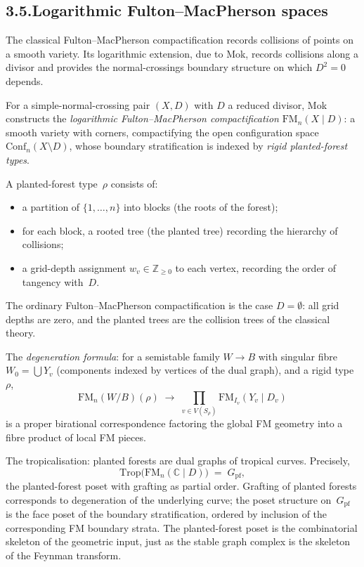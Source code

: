 \documentclass[11pt]{report}
\theoremstyle{definition}
\theoremstyle{remark}
\numberwithin{equation}{section}
\begin{document}
\subsection*{3.5.\enspace Logarithmic Fulton--MacPherson spaces}

The classical Fulton--MacPherson
compactification records collisions of points on a smooth variety.
Its logarithmic extension, due to Mok, records collisions along
a divisor and provides the normal-crossings boundary structure
on which $D^2=0$ depends.

For a simple-normal-crossing pair $(X,D)$ with $D$ a reduced divisor,
Mok constructs the \emph{logarithmic Fulton--MacPherson
compactification} $\mathrm{FM}_n(X\mathbin{|}D)$: a smooth
variety with corners, compactifying the open configuration space
$\mathrm{Conf}_n(X\setminus D)$, whose boundary stratification is
indexed by \emph{rigid planted-forest types}.

A planted-forest type~$\rho$ consists of:
\begin{itemize}
\item a partition of $\{1,\dots,n\}$ into blocks (the roots of the
forest);
\item for each block, a rooted tree (the planted tree) recording the
hierarchy of collisions;
\item a grid-depth assignment $w_v\in\mathbb Z_{\ge 0}$ to each
vertex, recording the order of tangency with~$D$.
\end{itemize}
The ordinary Fulton--MacPherson compactification is the case
$D=\emptyset$: all grid depths are zero, and the planted trees are
the collision trees of the classical theory.

The \emph{degeneration formula}: for a semistable family $W\to B$
with singular fibre $W_0=\bigcup Y_v$ (components indexed by
vertices of the dual graph), and a rigid type~$\rho$,
\[
\mathrm{FM}_n(W/B)(\rho)
\;\longrightarrow\;
\prod_{v\in V(S_\rho)}
\mathrm{FM}_{I_v}(Y_v\mathbin{|}D_v)
\]
is a proper birational correspondence factoring the global
FM geometry into a fibre product of local FM pieces.

The tropicalisation: planted forests are dual graphs of tropical
curves. Precisely,
\[
\mathrm{Trop}\bigl(\mathrm{FM}_n(\mathbb C\mathbin{|}D)\bigr)
\;=\;
G_{\mathrm{pf}},
\]
the planted-forest poset with grafting as partial order. Grafting of
planted forests corresponds to degeneration of the underlying curve;
the poset structure on~$G_{\mathrm{pf}}$ is the face poset of the
boundary stratification, ordered by inclusion of the corresponding
FM boundary strata. The planted-forest poset
is the combinatorial skeleton of the geometric input, just as the
stable graph complex is the skeleton of the Feynman transform.
\end{document}
